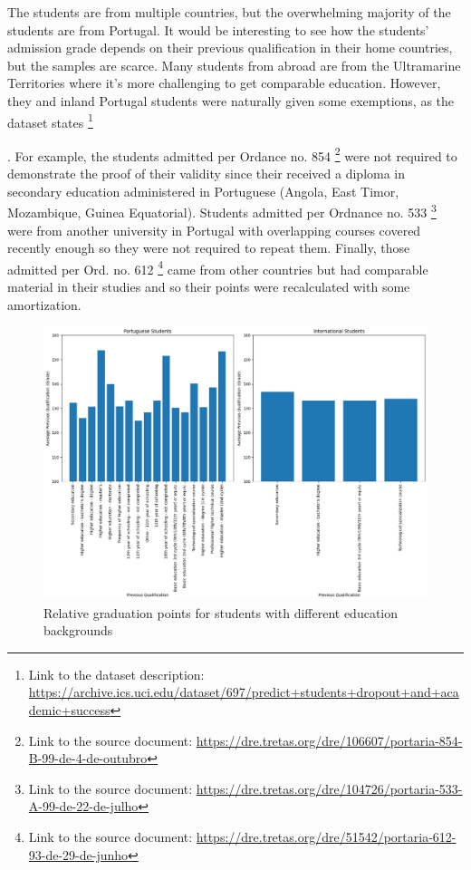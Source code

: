 \documentclass[
  letterpaper,
  DIV=11,
  numbers=noendperiod]{scrartcl}
\begin{document}
The students are from multiple countries, but the overwhelming majority
of the students are from Portugal. It would be interesting to see how
the students' admission grade depends on their previous qualification in
their home countries, but the samples are scarce. Many students from
abroad are from the Ultramarine Territories where it's more challenging
to get comparable education. However, they and inland Portugal students
were naturally given some exemptions, as the dataset states \footnote{Link
  to the dataset description:
  \url{https://archive.ics.uci.edu/dataset/697/predict+students+dropout+and+academic+success}}

. For example, the students admitted per Ordance no. 854 \footnote{Link
  to the source document:
  \url{https://dre.tretas.org/dre/106607/portaria-854-B-99-de-4-de-outubro}}
were not required to demonstrate the proof of their validity since their
received a diploma in secondary education administered in Portuguese
(Angola, East Timor, Mozambique, Guinea Equatorial). Students admitted
per Ordnance no. 533 \footnote{Link to the source document:
  \url{https://dre.tretas.org/dre/104726/portaria-533-A-99-de-22-de-julho}}
were from another university in Portugal with overlapping courses
covered recently enough so they were not required to repeat them.
Finally, those admitted per Ord. no. 612 \footnote{Link to the source
  document:
  \url{https://dre.tretas.org/dre/51542/portaria-612-93-de-29-de-junho}}
came from other countries but had comparable material in their studies
and so their points were recalculated with some amortization.

\begin{figure}

{\centering \includegraphics{report_AzadhdhinNedalYunisAlFraijat_files/figure-pdf/fig-education-output-1.png}

}

\caption{\label{fig-education}Relative graduation points for students
with different education backgrounds}

\end{figure}
\end{document}
